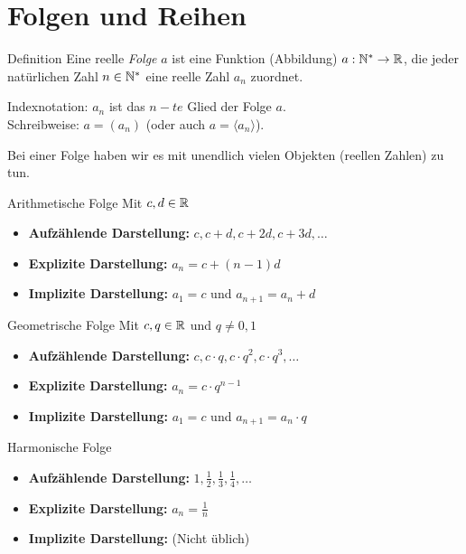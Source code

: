 \section{Folgen und Reihen}\label{sec:folgen-und-reihen}

\begin{definition}{Definition}
    Eine reelle \emph{Folge} $a$ ist eine Funktion (Abbildung) $a : \mathbb{N}^* \rightarrow \mathbb{R}$, die jeder natürlichen Zahl $n \in \mathbb{N}^*$ eine reelle Zahl $a_n$ zuordnet.

    Indexnotation: $a_n$ ist das $n-te$ Glied der Folge $a$.\\
    Schreibweise: $a = (a_n)$ (oder auch $a = \langle a_n \rangle$).

    Bei einer Folge haben wir es mit unendlich vielen Objekten (reellen Zahlen) zu tun.
\end{definition}

\begin{definition}{Arithmetische Folge}
    Mit $c,d \in \mathbb{R}$
    \begin{itemize}
        \item \textbf{Aufzählende Darstellung:} $c, c + d, c + 2d, c + 3d, \dots$
        \item \textbf{Explizite Darstellung:} $a_n = c + (n - 1)d$
        \item \textbf{Implizite Darstellung:} $a_1 = c$ und $a_{n+1} = a_n + d$
    \end{itemize}
\end{definition}

\begin{definition}{Geometrische Folge}
    Mit $c, q \in \mathbb{R}$ und $q \neq 0,1$
    \begin{itemize}
        \item \textbf{Aufzählende Darstellung:} $c, c \cdot q, c \cdot q^2, c \cdot q^3, \dots$
        \item \textbf{Explizite Darstellung:} $a_n = c \cdot q^{n-1}$
        \item \textbf{Implizite Darstellung:} $a_1 = c$ und $a_{n+1} = a_n \cdot q$
    \end{itemize}
\end{definition}

\begin{definition}{Harmonische Folge}
    \begin{itemize}
        \item \textbf{Aufzählende Darstellung:} $1, \frac{1}{2}, \frac{1}{3}, \frac{1}{4}, \dots$
        \item \textbf{Explizite Darstellung:} $a_n = \frac{1}{n}$
        \item \textbf{Implizite Darstellung:} (Nicht üblich)
    \end{itemize}
\end{definition}

